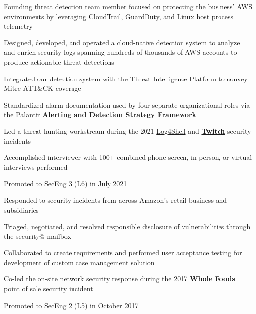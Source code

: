 \documentclass[letterpaper]{deedy-resume} %
\begin{document}
\begin{minipage}[t]{0.66\textwidth}
\begin{tightitemize}
\item Founding threat detection team member focused on protecting the business' AWS environments by leveraging CloudTrail, GuardDuty, and Linux host process telemetry
\item Designed, developed, and operated a cloud-native detection system to analyze and enrich security logs spanning hundreds of thousands of AWS accounts to produce actionable threat detections
\item Integrated our detection system with the Threat Intelligence Platform to convey Mitre ATT\&CK coverage
\item Standardized alarm documentation used by four separate organizational roles via the Palantir \textbf{\href{https://blog.palantir.com/alerting-and-detection-strategy-framework-52dc33722df2}{Alerting and Detection Strategy Framework}}
\item Led a threat hunting workstream during the 2021 \href{https://www.cisa.gov/news-events/cybersecurity-advisories/aa21-356a}{Log4Shell} and \textbf{\href{https://blog.twitch.tv/en/2021/10/15/updates-on-the-twitch-security-incident/}{Twitch}} security incidents
\item Accomplished interviewer with 100+ combined phone screen, in-person, or virtual interviews performed
\item Promoted to SecEng 3 (L6) in July 2021
\end{tightitemize}

\sectionspace %



\begin{tightitemize}
\item Responded to security incidents from across Amazon's retail business and subsidiaries
\item Triaged, negotiated, and resolved responsible disclosure of vulnerabilities through the security@ mailbox
\item Collaborated to create requirements and performed user acceptance testing for development of custom case management solution
\item Co-led the on-site network security response during the 2017 \textbf{\href{https://media.wholefoodsmarket.com/whole-foods-market-payment-card-investigation-update/}{Whole Foods}} point of sale security incident
\item Promoted to SecEng 2 (L5) in October 2017
\end{tightitemize}


\end{minipage}
\end{document}
